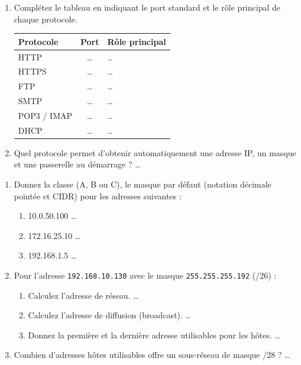 \documentclass[11pt]{article}
\begin{document}
\begin{exercice}
\begin{enumerate}
    \item Complétez le tableau en indiquant le port standard et le rôle principal de chaque protocole.
    \begin{tabular}{|l|c|l|}
    \hline
    \textbf{Protocole} & \textbf{Port} & \textbf{Rôle principal} \\
    \hline
    HTTP & \ldots & \ldots \\
    \hline
    HTTPS & \ldots & \ldots \\
    \hline
    FTP & \ldots & \ldots \\
    \hline
    SMTP & \ldots & \ldots \\
    \hline
    POP3 / IMAP & \ldots & \ldots \\
    \hline
    DHCP & \ldots & \ldots \\
    \hline
    \end{tabular}
    \item Quel protocole permet d'obtenir automatiquement une adresse IP, un masque et une passerelle au démarrage ? \ldots
\end{enumerate}
\end{exercice}

\begin{exercice}
\begin{enumerate}
    \item Donnez la classe (A, B ou C), le masque par défaut (notation décimale pointée et CIDR) pour les adresses suivantes :
    \begin{enumerate}
        \item 10.0.50.100 \ldots
        \item 172.16.25.10 \ldots
        \item 192.168.1.5 \ldots
    \end{enumerate}
    \item Pour l'adresse \texttt{192.168.10.130} avec le masque \texttt{255.255.255.192} (/26) :
    \begin{enumerate}
        \item Calculez l'adresse de réseau. \ldots
        \item Calculez l'adresse de diffusion (broadcast). \ldots
        \item Donnez la première et la dernière adresse utilisables pour les hôtes. \ldots
    \end{enumerate}
    \item Combien d'adresses hôtes utilisables offre un sous-réseau de masque /28 ? \ldots
\end{enumerate}
\end{exercice}
\end{document}
